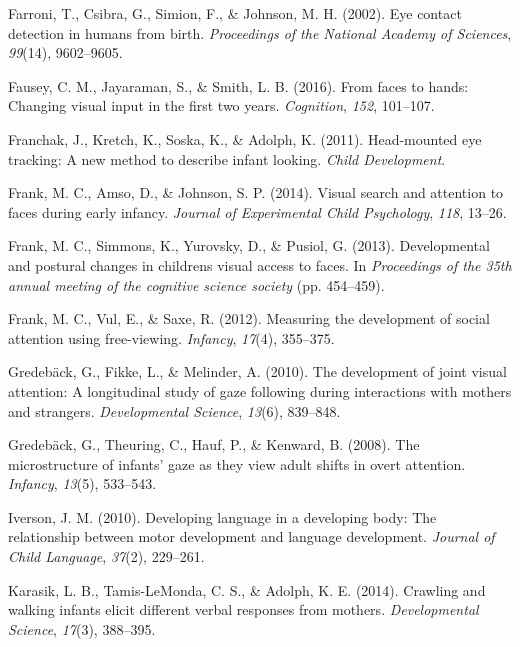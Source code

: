 \documentclass[10pt, letterpaper]{article}
\begin{document}
\hypertarget{ref-farroni2002eye}{}
Farroni, T., Csibra, G., Simion, F., \& Johnson, M. H. (2002). Eye
contact detection in humans from birth. \emph{Proceedings of the
National Academy of Sciences}, \emph{99}(14), 9602--9605.

\hypertarget{ref-fausey2016}{}
Fausey, C. M., Jayaraman, S., \& Smith, L. B. (2016). From faces to
hands: Changing visual input in the first two years. \emph{Cognition},
\emph{152}, 101--107.

\hypertarget{ref-franchak2011}{}
Franchak, J., Kretch, K., Soska, K., \& Adolph, K. (2011). Head-mounted
eye tracking: A new method to describe infant looking. \emph{Child
Development}.

\hypertarget{ref-frank2014visual}{}
Frank, M. C., Amso, D., \& Johnson, S. P. (2014). Visual search and
attention to faces during early infancy. \emph{Journal of Experimental
Child Psychology}, \emph{118}, 13--26.

\hypertarget{ref-frank2013}{}
Frank, M. C., Simmons, K., Yurovsky, D., \& Pusiol, G. (2013).
Developmental and postural changes in childrens visual access to faces.
In \emph{Proceedings of the 35th annual meeting of the cognitive science
society} (pp. 454--459).

\hypertarget{ref-frank2012measuring}{}
Frank, M. C., Vul, E., \& Saxe, R. (2012). Measuring the development of
social attention using free-viewing. \emph{Infancy}, \emph{17}(4),
355--375.

\hypertarget{ref-gredeback2010development}{}
Gredebäck, G., Fikke, L., \& Melinder, A. (2010). The development of
joint visual attention: A longitudinal study of gaze following during
interactions with mothers and strangers. \emph{Developmental Science},
\emph{13}(6), 839--848.

\hypertarget{ref-gredeback2008microstructure}{}
Gredebäck, G., Theuring, C., Hauf, P., \& Kenward, B. (2008). The
microstructure of infants' gaze as they view adult shifts in overt
attention. \emph{Infancy}, \emph{13}(5), 533--543.

\hypertarget{ref-iverson2010}{}
Iverson, J. M. (2010). Developing language in a developing body: The
relationship between motor development and language development.
\emph{Journal of Child Language}, \emph{37}(2), 229--261.

\hypertarget{ref-karasik2014}{}
Karasik, L. B., Tamis-LeMonda, C. S., \& Adolph, K. E. (2014). Crawling
and walking infants elicit different verbal responses from mothers.
\emph{Developmental Science}, \emph{17}(3), 388--395.
\end{document}

